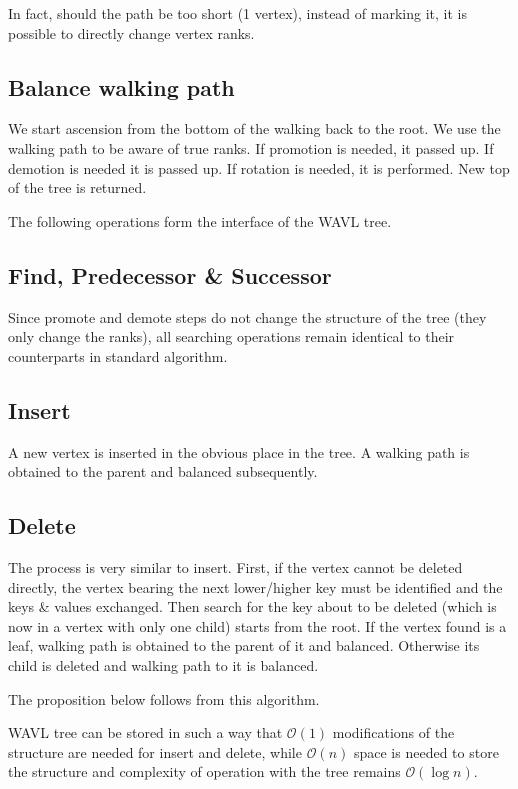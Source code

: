 In fact, should the path be too short (1 vertex), instead of marking it, it is possible to directly change vertex ranks.

\subsection{Balance walking path}

We start ascension from the bottom of the walking back to the root. We use the walking path to be aware of true ranks. If promotion is needed, it passed up. If demotion is needed it is passed up. If rotation is needed, it is performed. New top of the tree is returned. 

The following operations form the interface of the WAVL tree.

\subsection{Find, Predecessor \& Successor}

Since promote and demote steps do not change the structure of the tree (they only change the ranks), all searching operations remain identical to their counterparts in standard algorithm.

\subsection{Insert}

A new vertex is inserted in the obvious place in the tree. A walking path is obtained to the parent and balanced subsequently.

\subsection{Delete}

The process is very similar to insert. First, if the vertex cannot be deleted directly, the vertex bearing the next lower/higher key must be identified and the keys \& values exchanged. Then search for the key about to be deleted (which is now in a vertex with only one child) starts from the root. If the vertex found is a leaf, walking path is obtained to the parent of it and balanced. Otherwise its child is deleted and walking path to it is balanced.

The proposition below follows from this algorithm.

\begin{prop}
WAVL tree can be stored in such a way that $\mathcal{O}(1)$ modifications of the structure are needed for insert and delete, while $\mathcal{O}(n)$ space is needed to store the structure and complexity of operation with the tree remains $\mathcal{O}(\log n)$.
\end{prop}

